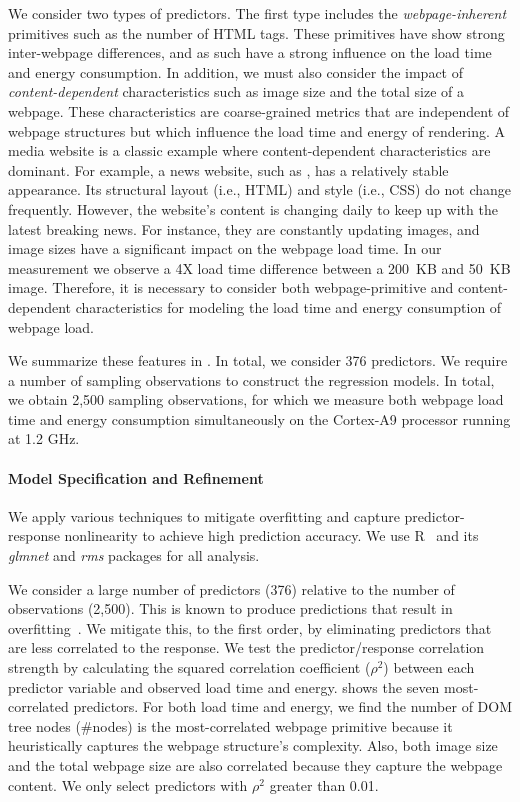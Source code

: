 We consider two types of predictors. The first type includes the \textit{webpage-inherent} primitives such as the number of HTML tags. These primitives have show strong inter-webpage differences, and as such have a strong influence on the load time and energy consumption. In addition, we must also consider the impact of \textit{content-dependent} characteristics such as image size and the total size of a webpage. These characteristics are coarse-grained metrics that are independent of webpage structures but which influence the load time and energy of rendering. A media website is a classic example where content-dependent characteristics are dominant. For example, a news website, such as , has a relatively stable appearance. Its structural layout (i.e., HTML) and style (i.e., CSS) do not change frequently. However, the website's content is changing daily to keep up with the latest breaking news. For instance, they are constantly updating images, and image sizes have a significant impact on the webpage load time. In our measurement we observe a 4X load time difference between a 200~KB and 50~KB image. Therefore, it is necessary to consider both webpage-primitive and content-dependent characteristics for modeling the load time and energy consumption of webpage load.

We summarize these features in . In total, we consider 376 predictors. We require a number of sampling observations to construct the regression models. In total, we obtain 2,500 sampling observations, for which we measure both webpage load time and energy consumption simultaneously on the Cortex-A9 processor running at 1.2 GHz.
 
\paragraph{Model Specification and Refinement} We apply various techniques to mitigate overfitting and capture predictor-response nonlinearity to achieve high prediction accuracy. We use R~\cite{R} and its \textit{glmnet} and \textit{rms} packages for all analysis.

We consider a large number of predictors (376) relative to the number of observations (2,500). This is known to produce predictions that result in overfitting~\cite{ESL}. We mitigate this, to the first order, by eliminating predictors that are less correlated to the response. We test the predictor/response correlation strength by calculating the squared correlation coefficient ($\rho^2$) between each predictor variable and observed load time and energy.  shows the seven most-correlated predictors. For both load time and energy, we find the number of DOM tree nodes (\textsf{\#nodes}) is the most-correlated webpage primitive because it heuristically captures the webpage structure's complexity. Also, both image size and the total webpage size are also correlated because they capture the webpage content. We only select predictors with $\rho^2$ greater than 0.01.

